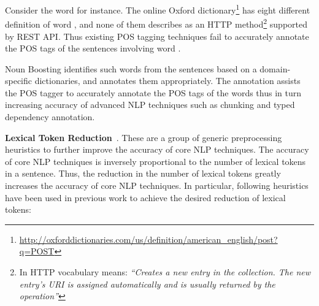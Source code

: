 Consider the word  for instance. 
The online Oxford dictionary\footnote{\url{http://oxforddictionaries.com/us/definition/american_english/post?q=POST}} has eight different definition of word , and none of them describes  as an HTTP method\footnote{In HTTP vocabulary  means: \textit{``Creates a new entry in the collection.
The new entry's URI is assigned automatically and is usually returned by the operation''}}
supported by REST API.
Thus existing POS tagging techniques fail to accurately annotate the POS tags of the sentences involving word .  

Noun Boosting identifies such words from the sentences based on a domain-specific dictionaries, and annotates them appropriately.
The annotation assists the POS tagger to accurately annotate the POS tags of the words thus in turn increasing accuracy of advanced NLP techniques such as chunking and typed dependency annotation.

\textbf{Lexical Token Reduction}~\cite{pandita13:WHYPER}.
These are a group of generic preprocessing heuristics to further improve the accuracy of core NLP techniques.
The accuracy of core NLP techniques is inversely proportional to the number of lexical tokens in a sentence.
Thus, the reduction in the number of lexical tokens greatly increases the accuracy of core NLP techniques. 
In particular, following heuristics have been used in previous work to achieve the desired reduction of lexical tokens:

